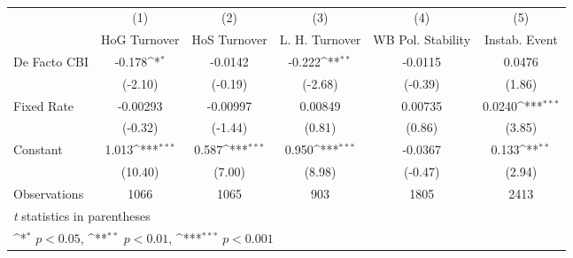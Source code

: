 \begin{table}[htbp]\centering
\def\sym#1{\ifmmode^{#1}\else\(^{#1}\)\fi}
\caption{\label{democraciesFEDF}}
\begin{tabular}{l*{5}{c}}
\toprule
                                        &\multicolumn{1}{c}{(1)}&\multicolumn{1}{c}{(2)}&\multicolumn{1}{c}{(3)}&\multicolumn{1}{c}{(4)}&\multicolumn{1}{c}{(5)}\\
                                        &\multicolumn{1}{c}{HoG Turnover}&\multicolumn{1}{c}{HoS Turnover}&\multicolumn{1}{c}{L. H. Turnover}&\multicolumn{1}{c}{WB Pol. Stability}&\multicolumn{1}{c}{Instab. Event}\\
\midrule
De Facto CBI                            &   -0.178\sym{*}  &  -0.0142         &   -0.222\sym{**} &  -0.0115         &   0.0476         \\
                                        &  (-2.10)         &  (-0.19)         &  (-2.68)         &  (-0.39)         &   (1.86)         \\
\addlinespace
Fixed Rate                              & -0.00293         & -0.00997         &  0.00849         &  0.00735         &   0.0240\sym{***}\\
                                        &  (-0.32)         &  (-1.44)         &   (0.81)         &   (0.86)         &   (3.85)         \\
\addlinespace
Constant                                &    1.013\sym{***}&    0.587\sym{***}&    0.950\sym{***}&  -0.0367         &    0.133\sym{**} \\
                                        &  (10.40)         &   (7.00)         &   (8.98)         &  (-0.47)         &   (2.94)         \\
\midrule
Observations                            &     1066         &     1065         &      903         &     1805         &     2413         \\
\bottomrule
\multicolumn{6}{l}{\footnotesize \textit{t} statistics in parentheses}\\
\multicolumn{6}{l}{\footnotesize \sym{*} \(p<0.05\), \sym{**} \(p<0.01\), \sym{***} \(p<0.001\)}\\
\end{tabular}
\end{table}
